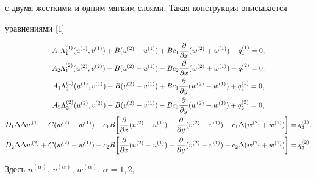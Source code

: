с двумя жесткими и одним мягким слоями. Такая конструкция описывается 


уравнениями [1] 


\begin{gather} 


A_1\Lambda^{(1)}_1(u^{(1)},v^{(1)}) 


+B(u^{(2)}-u^{(1)})+Bc_1\frac{\partial}{\partial x} 


(w^{(2)}+w^{(1)})+q^{(1)}_1=0,\notag\\ 


% 


A_2\Lambda^{(2)}_1(u^{(2)},v^{(2)}) 


-B(u^{(2)}-u^{(1)})-Bc_2\frac{\partial}{\partial x} 


(w^{(2)}+w^{(1)})+q^{(2)}_1=0,\notag\\ 


%


A_1\Lambda^{(1)}_2(u^{(1)},v^{(1)}) 


+B(v^{(2)}-v^{(1)})+Bc_1\frac{\partial}{\partial y} 


(w^{(2)}+w^{(1)})+q^{(1)}_2=0,\notag \\ 


%


A_2\Lambda^{(2)}_2(u^{(2)},v^{(2)}) 


-B(v^{(2)}-v^{(1)})-Bc_2\frac{\partial}{\partial y} 


(w^{(2)}+w^{(1)})+q^{(2)}_2=0, \\ 


%


D_1\Delta\Delta w^{(1)}-C(w^{(2)}-w^{(1)})-c_1B\bigg[ 


\frac{\partial}{\partial x}(u^{(2)}-u^{(1)}) 


-\frac{\partial}{\partial y}(v^{(2)}-v^{(1)})- 


c_1\Delta(w^{(2)}+w^{(1)})\bigg]=q^{(1)}_3,\notag \\ 


% 


D_2\Delta\Delta w^{(2)}+C(w^{(2)}-w^{(1)})-c_2B\bigg[ 


\frac{\partial}{\partial x}(u^{(2)}-u^{(1)}) 


-\frac{\partial}{\partial y}(v^{(2)}-v^{(1)})- 


c_2\Delta(w^{(2)}+w^{(1)})\bigg]=q^{(2)}_3.\notag


\end{gather} 


Здесь $u^{(\alpha)}$, $v^{(\alpha)}$, $w^{(\alpha)}$, $\alpha=1,2$, --- 



